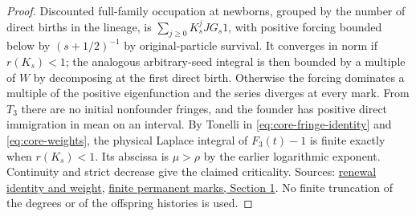 \documentclass[11pt]{article}
\newcommand{\proofsrc}[2]{\href{https://github.com/uzay-eth/friend-tree-exponent/blob/a0972085ad72ad5685ae7b424988648d1965e73c/#1}{#2}}
\theoremstyle{remark}
\numberwithin{equation}{section}
\begin{document}
\begin{proof}
Discounted full-family occupation at newborns, grouped by the number of direct births in the lineage, is $\sum_{j\ge0} K_s^j JG_s1$, with positive forcing bounded below by $(s+1/2)^{-1}$ by original-particle survival. It converges in norm if $r(K_s)<1$; the analogous arbitrary-seed integral is then bounded by a multiple of $W$ by decomposing at the first direct birth. Otherwise the forcing dominates a multiple of the positive eigenfunction and the series diverges at every mark. From $T_3$ there are no initial nonfounder fringes, and the founder has positive direct immigration in mean on an interval. By Tonelli in \eqref{eq:core-fringe-identity} and \eqref{eq:core-weights}, the physical Laplace integral of $F_3(t)-1$ is finite exactly when $r(K_s)<1$. Its abscissa is $\mu>\rho$ by the earlier logarithmic exponent. Continuity and strict decrease give the claimed criticality. Sources: \proofsrc{round2/proofs/astra/source/round2/fringe/renewal.md}{renewal identity and weight}, \proofsrc{round2/proofs/astra/source/round2/fringe/finite-kernel.md}{finite permanent marks, Section 1}. No finite truncation of the degrees or of the offspring histories is used.
\end{proof}
\end{document}
